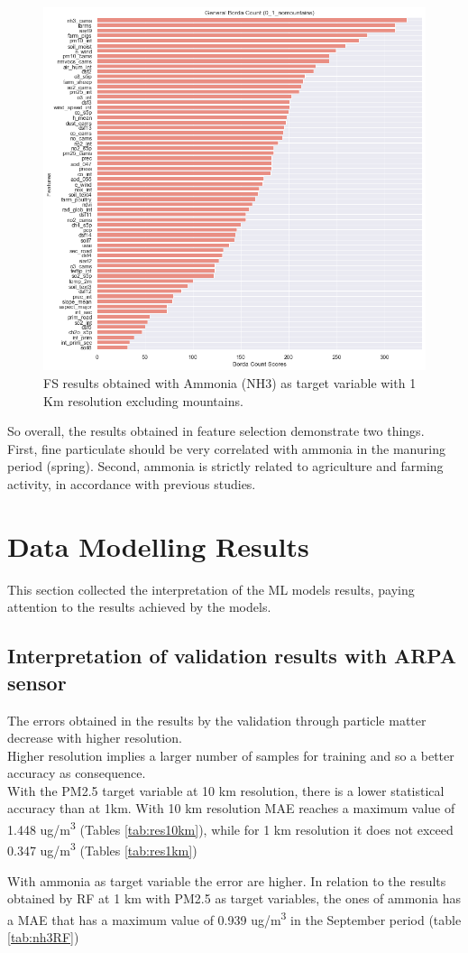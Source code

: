 \begin{figure}[H]
\centering
\includegraphics[scale =0.50]{images/tests/0_1_nomountainsnh3_st.png}
\caption{FS results obtained with Ammonia (NH3) as target variable with 1 Km resolution excluding mountains.}
\label{fig:fs_nh3}
\end{figure}
So overall, the results obtained in feature selection demonstrate two things.\\
First, fine particulate should be very correlated with ammonia in the manuring period (spring). Second, ammonia is strictly related to agriculture and farming activity, in accordance with previous studies.\pagebreak
\section{Data Modelling Results}
\label{sec:modelling2}
This section collected the interpretation of the ML models results, paying attention to the results achieved by the models. 
\subsection{Interpretation of validation results with ARPA sensor}
The errors obtained in the results by the validation through particle matter decrease with higher resolution.\\
Higher resolution implies a larger number of samples for training and so a better accuracy as consequence.\\
With the PM2.5 target variable at 10 km resolution, there is a lower statistical accuracy than at 1km.
With 10 km resolution MAE reaches a maximum value of 1.448 ug/m\textsuperscript{3} (Tables \ref{tab:res10km}), while for 1 km resolution it does not exceed 0.347 ug/m\textsuperscript{3} (Tables \ref{tab:res1km})
\par 
With ammonia as target variable the error are higher.
In relation to the results obtained by RF at 1 km with PM2.5 as target variables, the ones of ammonia has a MAE that has a maximum value of 0.939 ug/m\textsuperscript{3} in the September period (table \ref{tab:nh3RF})

